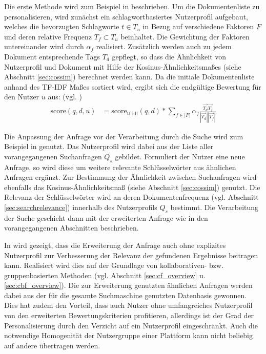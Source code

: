 Die erste Methode wird zum Beispiel in \citep{Durao12} beschrieben. Um die Dokumentenliste zu personalisieren, wird zunächst ein schlagwortbasiertes Nutzerprofil aufgebaut, welches die bevorzugten Schlagworte $t \in T_u$ in Bezug auf verschiedene Faktoren $F$ und deren relative Frequenz $T_f \subset T_u$ beinhaltet. Die Gewichtung der Faktoren untereinander wird durch $\alpha_f$ realisiert. Zusätzlich werden auch zu jedem Dokument entsprechende Tags $T_d$ gepflegt, so dass die Ähnlichkeit von Nutzerprofil und Dokument mit Hilfe der Kosinus-Ähnlichkeitsmaßes (siehe Abschnitt \ref{sec:cossim}) berechnet werden kann. Da die initiale Dokumentenliste anhand des TF-IDF Maßes sortiert wird, ergibt sich die endgültige Bewertung für den Nutzer $u$ aus:  (vgl. \citep{Durao12})
\begin{align}
\text{score}(q,d,u) & = \text{score}_{\text{tf-idf}}(q,d) * \sum_{f \in |F|}{\alpha_f \frac{\overrightarrow{T_d} \overrightarrow{T_f}}{|\overrightarrow{T_d}| |\overrightarrow{T_f}|}} \label{form:personalresultstheorie}
\end{align}

Die Anpassung der Anfrage vor der Verarbeitung durch die Suche wird zum Beispiel in \citep{Boughareb11} genutzt. Das Nutzerprofil wird dabei aus der Liste aller vorangegangenen Suchanfragen $Q_s$ gebildet. Formuliert der Nutzer eine neue Anfrage, so wird diese um weitere relevante Schlüsselwörter aus ähnlichen Anfragen ergänzt. Zur Bestimmung der Ähnlichkeit zwischen Suchanfragen wird ebenfalls das Kosinus-Ähnlichkeitsmaß (siehe Abschnitt \ref{sec:cossim}) genutzt. Die Relevanz der Schlüsselwörter wird an deren Dokumentenfrequenz (vgl. Abschnitt \ref{sec:searchrelevance}) innerhalb des Nutzerprofils $Q_s$ bestimmt. Die Verarbeitung der Suche geschieht dann mit der erweiterten Anfrage wie in den vorangegangenen Abschnitten beschrieben.

In \citep{smyth05a} wird gezeigt, dass die Erweiterung der Anfrage auch ohne explizites Nutzerprofil zur Verbesserung der Relevanz der gefundenen Ergebnisse beitragen kann. Realisiert wird dies auf der Grundlage von kollaborativen- bzw. gruppenbasierten Methoden (vgl. Abschnitt \ref{sec:cf_overview} u. \ref{sec:cbf_overview}). Die zur Erweiterung genutzten ähnlichen Anfragen werden dabei aus der für die gesamte Suchmaschine genutzten Datenbasis gewonnen. Dies hat zudem den Vorteil, dass auch Nutzer ohne umfangreiches Nutzerprofil von den erweiterten Bewertungskriterien profitieren, allerdings ist der Grad der Personalisierung durch den Verzicht auf ein Nutzerprofil eingeschränkt. Auch die notwendige Homogenität der Nutzergruppe einer Plattform kann nicht beliebig auf andere übertragen werden. \citep{smyth05a}

